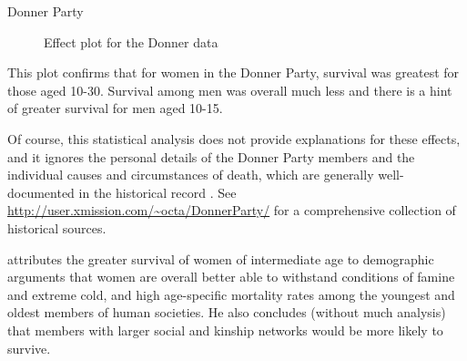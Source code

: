 \documentclass[11pt]{book}
\renewenvironment{knitrout}{\small\renewcommand{\baselinestretch}{.85}}{} %
\begin{document}
\begin{Example}[donner1]{Donner Party}
\begin{knitrout}
\begin{figure}[!htbp]
\caption[Effect plot for the Donner data]{Effect plot for the Donner data\label{fig:donner-effect}}
\end{figure}


\end{knitrout}
This plot confirms that for women in the Donner Party, survival was greatest for
those aged 10-30.  Survival among men was overall much less and there is a 
hint of greater survival for men aged 10-15.

Of course, this statistical analysis does not provide explanations for these
effects, and it ignores the personal details of the Donner Party members and
the individual causes and circumstances of death, which are generally well-documented in the historical record \citep{Johnson:1996}.  See \url{http://user.xmission.com/~octa/DonnerParty/} for a comprehensive collection of historical sources.

\citet{Grayson:1990} attributes the greater survival of women of intermediate age to  
demographic arguments that women are overall better able to withstand conditions
of famine and extreme cold, and high age-specific mortality rates among the
youngest and oldest members of human societies.  He also concludes
(without much analysis) that members with larger social and kinship networks
would be more likely to survive.
\end{Example}
\end{document}
